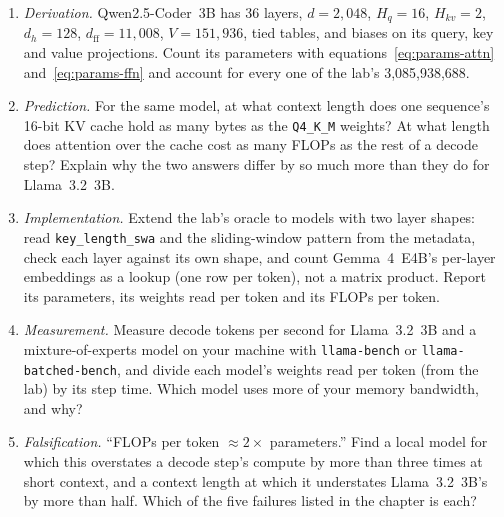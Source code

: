 \begin{enumerate}
\item \emph{Derivation.} Qwen2.5-Coder~3B has 36 layers, $d = 2{,}048$,
$H_q = 16$, $H_{kv} = 2$, $d_h = 128$, $d_{\mathrm{ff}} = 11{,}008$,
$V = 151{,}936$, tied tables, and biases on its query, key and value
projections. Count its parameters with equations~\eqref{eq:params-attn}
and~\eqref{eq:params-ffn} and account for every one of the lab's
3,085,938,688.
\item \emph{Prediction.} For the same model, at what context length does one
sequence's 16-bit KV cache hold as many bytes as the \texttt{Q4\_K\_M}
weights? At what length does attention over the cache cost as many FLOPs as
the rest of a decode step? Explain why the two answers differ by so much more
than they do for Llama~3.2~3B.
\item \emph{Implementation.} Extend the lab's oracle to models with two layer
shapes: read \texttt{key\_length\_swa} and the sliding-window pattern from the
metadata, check each layer against its own shape, and count Gemma~4~E4B's
per-layer embeddings as a lookup (one row per token), not a matrix product.
Report its parameters, its weights read per token and its FLOPs per token.
\item \emph{Measurement.} Measure decode tokens per second for Llama~3.2~3B and
a mixture-of-experts model on your machine with \texttt{llama-bench} or
\texttt{llama-batched-bench}, and divide each model's weights read per token
(from the lab) by its step time. Which model uses more of your memory
bandwidth, and why?
\item \emph{Falsification.} ``FLOPs per token $\approx 2\times$ parameters.''
Find a local model for which this overstates a decode step's compute by more
than three times at short context, and a context length at which it
understates Llama~3.2~3B's by more than half. Which of the five failures
listed in the chapter is each?
\end{enumerate}


